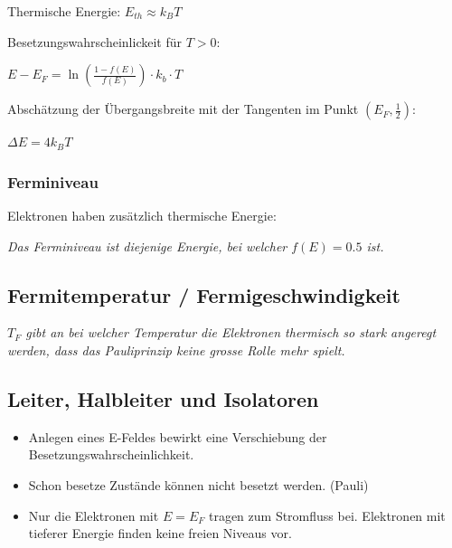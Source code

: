\documentclass[10pt,a4paper]{scrartcl}
\begin{document}
\begin{multicols*}{3}
	\finn	
	
	Thermische Energie: $E_{th}\approx k_BT$
	
	Besetzungswahrscheinlickeit für $T>0$:
	
	
	$E-E_F=\ln\left(\frac{1-f(E)}{f(E)}\right)\cdot k_b\cdot T$
	
	
	Abschätzung der Übergangsbreite mit der Tangenten im Punkt $(E_F,\frac{1}{2})$:
	
	$\Delta E=4k_BT$	
	
	\subsubsection*{Ferminiveau}	
	
	\dahe Elektronen haben zusätzlich thermische Energie:
	
	\emph{Das Ferminiveau ist diejenige Energie, bei welcher $f(E)=0.5$ ist.}
	
	\subsection*{Fermitemperatur / Fermigeschwindigkeit}
	
	
	\emph{$T_F$ gibt an bei welcher Temperatur die Elektronen thermisch so stark angeregt werden, dass das Pauliprinzip keine grosse Rolle mehr spielt.}
	
		
	\subsection*{Leiter, Halbleiter und Isolatoren}
	
	\begin{itemize}
	\compaq
	\item
	Anlegen eines E-Feldes bewirkt eine Verschiebung der Besetzungswahrscheinlichkeit.
	\item
	Schon besetze Zustände können nicht besetzt werden. (Pauli)
	\item
	Nur die Elektronen mit $E=E_F$ tragen zum Stromfluss bei. Elektronen mit tieferer Energie finden keine freien Niveaus vor.
	\end{itemize}
	
	

\end{multicols*}
\end{document}

